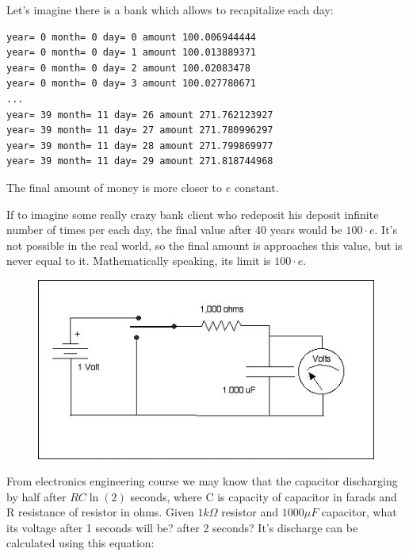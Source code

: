 Let's imagine there is a bank which allows to recapitalize each day:



\begin{lstlisting}
year= 0 month= 0 day= 0 amount 100.006944444
year= 0 month= 0 day= 1 amount 100.013889371
year= 0 month= 0 day= 2 amount 100.02083478
year= 0 month= 0 day= 3 amount 100.027780671
...
year= 39 month= 11 day= 26 amount 271.762123927
year= 39 month= 11 day= 27 amount 271.780996297
year= 39 month= 11 day= 28 amount 271.799869977
year= 39 month= 11 day= 29 amount 271.818744968
\end{lstlisting}

The final amount of money is more closer to $e$ constant.

If to imagine some really crazy bank client who redeposit his deposit infinite number of times per each day, the final value after 40 years
would be $100 \cdot e$.
It's not possible in the real world, so the final amount is approaches this value, but is never equal to it.
Mathematically speaking, its limit is $100 \cdot e$.


\leveldown{}


\begin{figure}[H]
\centering
\includegraphics[scale=0.66]{log/Schematic_of_Battery_and_Capacitor.jpg}
\end{figure}

From electronics engineering course we may know that the capacitor discharging by half after $RC\ln(2)$ seconds,
where C is capacity of capacitor in farads and R resistance of resistor in ohms.
Given $1k\Omega$ resistor and $1000 \mu F$ capacitor, what its voltage after 1 seconds will be? after 2 seconds?
It's discharge can be calculated using this equation:

